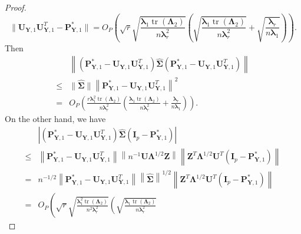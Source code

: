 \documentclass[12pt]{article} %
\DeclareMathOperator{\mytr}{tr}
\newcommand{\bZ}{\mathbf{Z}}
\newcommand{\bP}{\mathbf{P}}
\newcommand{\bY}{\mathbf{Y}}
\newcommand{\bI}{\mathbf{I}}
\newcommand{\bU}{\mathbf{U}}
\newcommand{\bfsym}[1]{\ensuremath{\boldsymbol{#1}}}
\def\blambda {\bfsym {\lambda}}
\def\bLambda {\bfsym {\Lambda}}
\def\bSigma {\bfsym {\Sigma}}
\theoremstyle{definition}
\begin{document}
\begin{appendices}
\begin{proof}
\begin{equation*}
            \Big\|
         \bU_{\bY,1}\bU_{\bY,1}^T
         -\bP_{\bY,1}^*
            \Big\|
            =
            O_P
                \left(
                    \sqrt{r}\sqrt{\frac{\blambda_1 \mytr(\bLambda_2)}{n\blambda_r^2}}
                    \left(
\sqrt{\frac{\blambda_1 \mytr(\bLambda_2)}{n\blambda_r^2}}
+\sqrt{\frac{\blambda_r}{n\blambda_1}}
                    \right)
                \right).
    \end{equation*}
     Then
     \begin{equation}\label{aiBound1}
        \begin{split}
             &\left\|
             (\bP^*_{\bY,1}-\bU_{\bY,1}\bU_{\bY,1}^T)\hat{\bSigma}(\bP^*_{\bY,1}-\bU_{\bY,1}\bU_{\bY,1}^T)
             \right\|
             \\
             \leq&
             \|\hat{\bSigma}\|
             \left\|
             \bP^*_{\bY,1}-\bU_{\bY,1}\bU_{\bY,1}^T
             \right\|^2
             \\
                 =&
            O_P
                \left(
                    \frac{r\blambda_1^2 \mytr(\bLambda_2)}{n\blambda_r^2}
                    \left(
\frac{\blambda_1 \mytr(\bLambda_2)}{n\blambda_r^2}
+\frac{\blambda_r}{n\blambda_1}
                    \right)
                \right).
        \end{split}
    \end{equation}
    On the other hand, we have
    \begin{equation*}
        \begin{split}
             &\left|(\bP^*_{\bY,1}-\bU_{\bY,1}\bU_{\bY,1}^T)\hat{\bSigma}(\bI_p-\bP^*_{\bY,1})\right|
             \\
             \leq &
             \left\|\bP^*_{\bY,1}-\bU_{\bY,1}\bU_{\bY,1}^T\right\|
             \left\|n^{-1}\bU \bLambda^{1/2} \bZ\right\|
             \left\|\bZ^T \bLambda^{1/2} \bU^T (\bI_p-\bP^*_{\bY,1})\right\|
             \\
             = &
             n^{-1/2}\left\|\bP^*_{\bY,1}-\bU_{\bY,1}\bU_{\bY,1}^T\right\|
             \left\|\hat{\bSigma}\right\|^{1/2}
             \left\|\bZ^T \bLambda^{1/2} \bU^T (\bI_p-\bP^*_{\bY,1})\right\|
             \\
             =&
            O_P
                \left(
                    \sqrt{r}\sqrt{\frac{\blambda_1^2 \mytr(\bLambda_2)}{n^2 \blambda_r^2}}
                    \left(
\sqrt{\frac{\blambda_1 \mytr(\bLambda_2)}{n\blambda_r^2}}

\end{split}
\end{equation*}
\end{proof}
\end{appendices}
\end{document}
